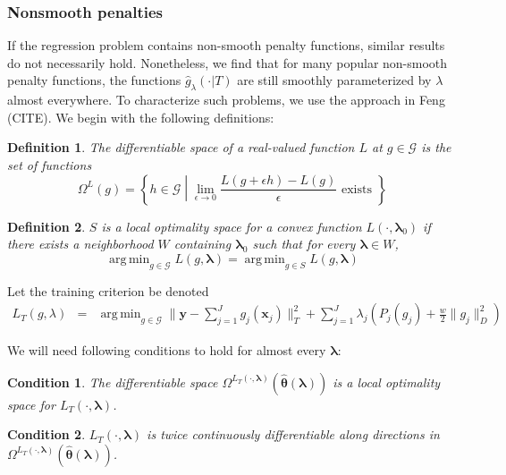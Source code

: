 \documentclass[12pt]{article}
\newtheorem{definition}{Definition}
\newtheorem{condition}{Condition}
\DeclareMathOperator*{\argmin}{arg\,min}
\begin{document}
\subsubsection{Nonsmooth penalties}\label{sec:nonsmooth}

If the regression problem contains non-smooth penalty functions, similar results do not necessarily hold. Nonetheless, we find that for many popular non-smooth penalty functions, the functions $\hat{g}_\lambda(\cdot | T)$ are still smoothly parameterized by $\lambda$ almost everywhere. To characterize such problems, we use the approach in Feng (CITE). We begin with the following definitions:

\begin{definition}
The differentiable space of a real-valued function $L$ at $g \in \mathcal{G}$ is the set of functions
\begin{equation}
\Omega^{L}(g) = \left \{ h \in \mathcal{G} \middle | \lim_{\epsilon \rightarrow 0} \frac{L(g + \epsilon h) - L(g)}{\epsilon} \text{ exists } \right \}
\end{equation}
\end{definition}

\begin{definition}
$S$ is a local optimality space for a convex function $L(\cdot, \boldsymbol \lambda_0)$ if there exists a neighborhood $W$ containing $\boldsymbol \lambda_0$ such that for every $\boldsymbol \lambda \in W$,
\begin{equation}
\argmin_{g \in \mathcal{G}} L(g, \boldsymbol \lambda) =
\argmin_{g \in S} L(g, \boldsymbol \lambda)
\end{equation}
\end{definition}

Let the training criterion be denoted
\begin{eqnarray*}
L_T(g, \lambda) &=& \argmin_{g\in \mathcal{G}} \| \boldsymbol y -  \sum_{j=1}^J g_j(\boldsymbol x_j) \|^2_T + \sum_{j=1}^J \lambda_j \left ( P_j(g_j) + \frac{w}{2} \| g_j \|^2_D \right )
\end{eqnarray*}

We will need following conditions to hold for almost every $\boldsymbol{\lambda}$:
\begin{condition}
\label{condn:nonsmooth1}
The differentiable space $\Omega^{L_T(\cdot, \boldsymbol{\lambda})}(\hat{\boldsymbol \theta}\left(\boldsymbol{\lambda}\right))$ is a local optimality space for $L_T\left(\cdot,\boldsymbol{\lambda}\right)$.
\end{condition}
\begin{condition}
\label{condn:nonsmooth2}
$L_T(\cdot, \boldsymbol{\lambda})$ is twice continuously differentiable along directions in $\Omega^{L_T(\cdot, \boldsymbol{\lambda})}(\hat{\boldsymbol \theta}\left(\boldsymbol{\lambda}\right))$. 
\end{condition}
\end{document}
